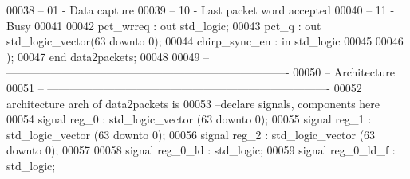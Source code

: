 \begin{DoxyCode}
00038 \textcolor{keyword}{                                                            -- 01 - Data capture}
00039 \textcolor{keyword}{                                                            -- 10 - Last packet word accepted}
00040 \textcolor{keyword}{                                                            -- 11 - Busy}
00041 
00042       \textcolor{vhdlchar}{pct_wrreq}         \textcolor{vhdlchar}{:} \textcolor{keywordflow}{out} \textcolor{comment}{std\_logic};
00043       \textcolor{vhdlchar}{pct_q}             \textcolor{vhdlchar}{:} \textcolor{keywordflow}{out} \textcolor{comment}{std\_logic\_vector}\textcolor{vhdlchar}{(}\textcolor{vhdllogic}{}\textcolor{vhdllogic}{63} \textcolor{keywordflow}{downto} \textcolor{vhdllogic}{}\textcolor{vhdllogic}{0}\textcolor{vhdlchar}{)};
00044         \textcolor{vhdlchar}{chirp_sync_en}       \textcolor{vhdlchar}{:} \textcolor{keywordflow}{in} \textcolor{comment}{std\_logic}
00045       
00046         \textcolor{vhdlchar}{)};
00047 \textcolor{keywordflow}{end} \textcolor{vhdlchar}{data2packets};
00048 
00049 \textcolor{keyword}{-- ----------------------------------------------------------------------------}
00050 \textcolor{keyword}{-- Architecture}
00051 \textcolor{keyword}{-- ----------------------------------------------------------------------------}
00052 \textcolor{keywordflow}{architecture} arch \textcolor{keywordflow}{of} data2packets is
00053 \textcolor{keyword}{--declare signals,  components here}
00054 \textcolor{keywordflow}{signal} \textcolor{vhdlchar}{reg_0}      \textcolor{vhdlchar}{:} \textcolor{comment}{std\_logic\_vector} \textcolor{vhdlchar}{(}\textcolor{vhdllogic}{}\textcolor{vhdllogic}{63} \textcolor{keywordflow}{downto} \textcolor{vhdllogic}{}\textcolor{vhdllogic}{0}\textcolor{vhdlchar}{)}; 
00055 \textcolor{keywordflow}{signal} \textcolor{vhdlchar}{reg_1}      \textcolor{vhdlchar}{:} \textcolor{comment}{std\_logic\_vector} \textcolor{vhdlchar}{(}\textcolor{vhdllogic}{}\textcolor{vhdllogic}{63} \textcolor{keywordflow}{downto} \textcolor{vhdllogic}{}\textcolor{vhdllogic}{0}\textcolor{vhdlchar}{)}; 
00056 \textcolor{keywordflow}{signal} \textcolor{vhdlchar}{reg_2}      \textcolor{vhdlchar}{:} \textcolor{comment}{std\_logic\_vector} \textcolor{vhdlchar}{(}\textcolor{vhdllogic}{}\textcolor{vhdllogic}{63} \textcolor{keywordflow}{downto} \textcolor{vhdllogic}{}\textcolor{vhdllogic}{0}\textcolor{vhdlchar}{)}; 
00057 
00058 \textcolor{keywordflow}{signal} \textcolor{vhdlchar}{reg_0_ld}   \textcolor{vhdlchar}{:} \textcolor{comment}{std\_logic};
00059 \textcolor{keywordflow}{signal} \textcolor{vhdlchar}{reg_0_ld_f} \textcolor{vhdlchar}{:} \textcolor{comment}{std\_logic};

\end{DoxyCode}

